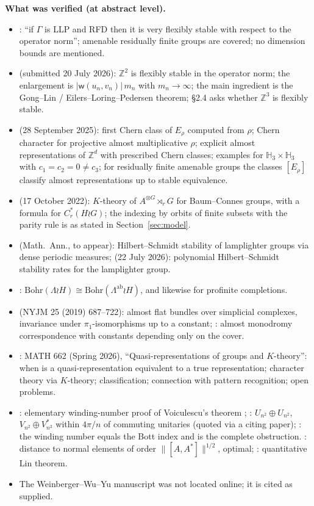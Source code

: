 \documentclass[11pt]{amsart}
\theoremstyle{definition}
\theoremstyle{remark}
\newcommand{\Z}{\mathbb Z}
\newcommand{\wind}{\mathsf w}
\newcommand{\norm}[1]{\lVert #1\rVert}
\begin{document}
\textbf{What was verified (at abstract level).}
\begin{itemize}[leftmargin=2em]
\item \cite{FW26}: ``if $\Gamma$ is LLP and RFD then it is very flexibly stable with respect to the operator norm''; amenable residually finite groups are covered; no dimension bounds are mentioned.
\item \cite{LS26} (submitted 20 July 2026): $\Z^2$ is flexibly stable in the operator norm; the enlargement is $|\wind(u_n,v_n)|\,m_n$ with $m_n\to\infty$; the main ingredient is the Gong--Lin / Eilers--Loring--Pedersen theorem; \S2.4 asks whether $\Z^3$ is flexibly stable.
\item \cite{DG25} (28 September 2025): first Chern class of $E_\rho$ computed from $\rho$; Chern character for projective almost multiplicative $\rho$; explicit almost representations of $\Z^d$ with prescribed Chern classes; examples for $\mathbb H_3\times\mathbb H_3$ with $c_1=c_2=0\ne c_3$; for residually finite amenable groups the classes $[E_\rho]$ classify almost representations up to stable equivalence.
\item \cite{CEKN22} (17 October 2022): $K$-theory of $A^{\otimes G}\rtimes_rG$ for Baum--Connes groups, with a formula for $C^*_r(H\wr G)$; the indexing by orbits of finite subsets with the parity rule is as stated in Section~\ref{sec:model}.
\item \cite{LV23} (Math.\ Ann., to appear): Hilbert--Schmidt stability of lamplighter groups via dense periodic measures; \cite{DV26} (22 July 2026): polynomial Hilbert--Schmidt stability rates for the lamplighter group.
\item \cite{Bek23}: $\mathrm{Bohr}(\Lambda\wr H)\cong\mathrm{Bohr}(\Lambda^{\mathrm{ab}}\wr H)$, and likewise for profinite completions.
\item \cite{Hun19} (NYJM 25 (2019) 687--722): almost flat bundles over simplicial complexes, invariance under $\pi_1$-isomorphisms up to a constant; \cite{Kub19}: almost monodromy correspondence with constants depending only on the cover.
\item \cite{Yu26}: MATH 662 (Spring 2026), ``Quasi-representations of groups and $K$-theory'': when is a quasi-representation equivalent to a true representation; character theory via $K$-theory; classification; connection with pattern recognition; open problems.
\item \cite{EL89}: elementary winding-number proof of Voiculescu's theorem \cite{Voi83}; \cite{Lor88}: $U_{n^2}\oplus U_{n^2}$, $V_{n^2}\oplus V^*_{n^2}$ within $4\pi/n$ of commuting unitaries (quoted via a citing paper); \cite{EL91}: the winding number equals the Bott index and is the complete obstruction. \cite{KS16}: distance to normal elements of order $\norm{[A,A^*]}^{1/2}$, optimal; \cite{Has09}: quantitative Lin theorem.
\item The Weinberger--Wu--Yu manuscript was not located online; it is cited as supplied.
\end{itemize}
\end{document}
